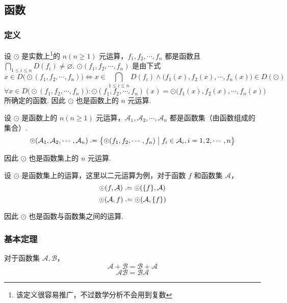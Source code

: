 \subsection{函数}
\subsubsection{定义}
\begin{definition}
    设 $\odot$ 是实数上\footnote{该定义很容易推广，不过数学分析不会用到复数}的 $n(n \geqslant 1)$ 元运算，$f_1, f_2, \cdots, f_n$ 都是函数且 $\displaystyle \bigcap_{1 \leqslant i \leqslant n}D(f_i) \neq \varnothing$. $\odot(f_1, f_2, \cdots, f_n)$ 是由下式
    \[x \in D\bigl(\odot(f_1, f_2, \cdots, f_n)\bigr) \Leftrightarrow x \in \bigcap_{1 \leqslant i \leqslant n}D(f_i) \wedge \bigl(f_1(x), f_2(x), \cdots, f_n(x)\bigr) \in D(\odot)\]
    \[\forall x \in D\bigl(\odot(f_1, f_2, \cdots, f_n)\bigr): \odot(f_1, f_2, \cdots, f_n)(x) = \odot\bigl(f_1(x), f_2(x), \cdots, f_n(x)\bigr)\]
    所确定的函数. 因此 $\odot$ 也是函数上的 $n$ 元运算.
\end{definition}\vspace{9pt}

\begin{definition}
    设 $\odot$ 是函数上的 $n(n \geqslant 1)$ 元运算，$\mathcal{A}_1, \mathcal{A}_2, \cdots, \mathcal{A}_n$ 都是函数集（由函数组成的集合）.
    \[\odot(\mathcal{A}_1, \mathcal{A}_2, \cdots, \mathcal{A}_n) \defeq \bigl\{ \odot(f_1, f_2, \cdots, f_n) \bigm| f_i \in \mathcal{A}_i, i=1,2,\cdots,n\bigr\}\]

    因此 $\odot$ 也是函数集上的 $n$ 元运算.
\end{definition}\vspace{9pt}

\begin{definition}
    设 $\odot$ 是函数集上的运算，这里以二元运算为例，对于函数 $f$ 和函数集 $\mathcal{A}$，
    \[\odot(f,\mathcal{A}) \defeq \odot(\{f\},\mathcal{A})\]
    \[\odot(\mathcal{A},f) \defeq \odot(\mathcal{A}, \{f\})\]

    因此 $\odot$ 也是函数与函数集之间的运算.
\end{definition}

\subsubsection{基本定理}
\begin{theorem}
    对于函数集 $\mathcal{A}, \mathcal{B}$，
    \[\mathcal{A} + \mathcal{B} = \mathcal{B} + \mathcal{A}\]
    \[\mathcal{AB} = \mathcal{BA}\]
\end{theorem}\vspace{9pt}

